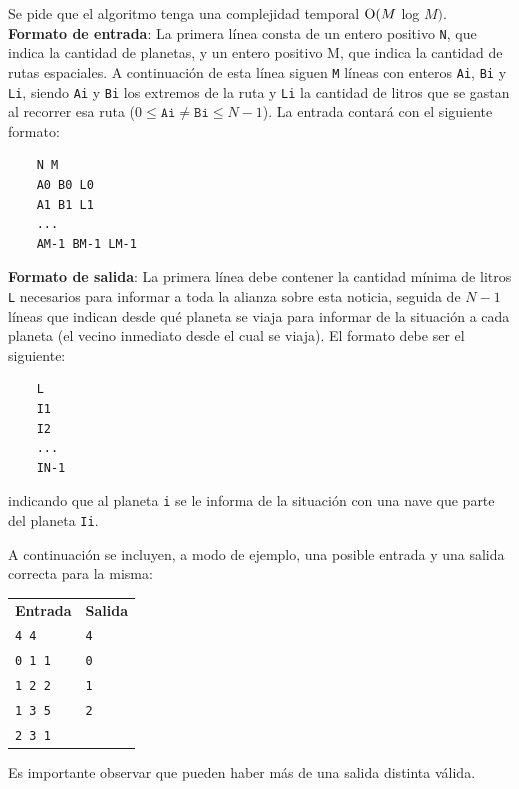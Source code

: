     Se pide que el algoritmo tenga una complejidad temporal $\operatorname{O}(M$ log $M)$. \\

    \textbf{Formato de entrada}: La primera línea consta de un entero positivo \texttt{N}, que indica la cantidad de planetas, y un entero positivo M, que indica la cantidad de rutas espaciales. A continuación de esta línea siguen \texttt{M} líneas con enteros \texttt{Ai}, \texttt{Bi} y \texttt{Li}, siendo \texttt{Ai} y \texttt{Bi} los extremos de la ruta y \texttt{Li} la cantidad de litros que se gastan al recorrer esa ruta ($0 \leq \mathtt{Ai} \neq \mathtt{Bi} \leq N-1$). La entrada contará con el siguiente formato:

    \begin{verbatim}
    N M
    A0 B0 L0 
    A1 B1 L1 
    ...
    AM-1 BM-1 LM-1
    \end{verbatim}

    \textbf{Formato de salida}: La primera línea debe contener la cantidad mínima de litros \texttt{L} necesarios para informar a toda la alianza sobre esta noticia, seguida de $N-1$ líneas que indican desde qué planeta se viaja para informar de la situación a cada planeta (el vecino inmediato desde el cual se viaja). El formato debe ser el siguiente:
    
    \begin{verbatim}
    L
    I1
    I2
    ...
    IN-1
    \end{verbatim}

    indicando que al planeta \texttt{i} se le informa de la situación con una nave que parte del planeta \texttt{Ii}.

    A continuación se incluyen, a modo de ejemplo, una posible entrada y una
    salida correcta para la misma:

    \begin{tabular}{ll}
    \textbf{Entrada} & \textbf{Salida} \\
    \texttt{4 4}     & \texttt{4}      \\
    \texttt{0 1 1}   & \texttt{0}      \\
    \texttt{1 2 2}   & \texttt{1}      \\
    \texttt{1 3 5}   & \texttt{2}      \\
    \texttt{2 3 1}   &                 \\
    \end{tabular}

    Es importante observar que pueden haber más de una salida distinta válida.

